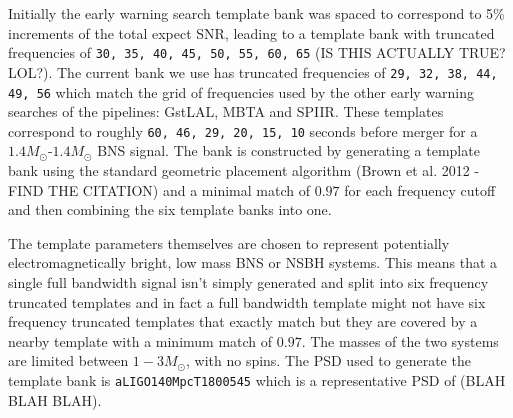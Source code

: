 Initially the early warning search template bank was spaced to correspond to 5\% increments of the total expect SNR, leading to a template bank with truncated frequencies of \verb|30, 35, 40, 45, 50, 55, 60, 65| (IS THIS ACTUALLY TRUE? LOL?). The current bank we use has truncated frequencies of \verb|29, 32, 38, 44, 49, 56| which match the grid of frequencies used by the other early warning searches of the pipelines: GstLAL, MBTA and SPIIR. These templates correspond to roughly \verb|60, 46, 29, 20, 15, 10| seconds before merger for a $1.4M_\odot$-$1.4M_\odot$ BNS signal. The bank is constructed by generating a template bank using the standard geometric placement algorithm (Brown et al. 2012 - FIND THE CITATION) and a minimal match of $0.97$ for each frequency cutoff and then combining the six template banks into one.

The template parameters themselves are chosen to represent potentially electromagnetically bright, low mass BNS or NSBH systems. This means that a single full bandwidth signal isn't simply generated and split into six frequency truncated templates and in fact a full bandwidth template might not have six frequency truncated templates that exactly match but they are covered by a nearby template with a minimum match of $0.97$. The masses of the two systems are limited between $1-3 M_\odot$, with no spins. The PSD used to generate the template bank is \verb|aLIGO140MpcT1800545| which is a representative PSD of (BLAH BLAH BLAH).

